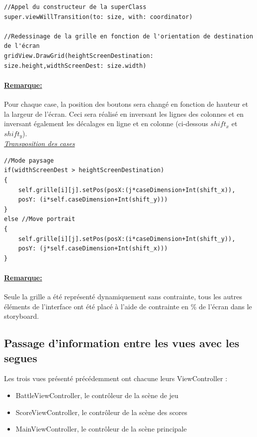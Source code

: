 \documentclass{article}
\begin{document}
\begin{verbatim}
//Appel du constructeur de la superClass
super.viewWillTransition(to: size, with: coordinator)

//Redessinage de la grille en fonction de l'orientation de destination de l'écran
gridView.DrawGrid(heightScreenDestination: size.height,widthScreenDest: size.width)
\end{verbatim}


\paragraph{\underline{Remarque:}} Pour chaque case, la position des boutons sera changé en fonction de hauteur et la largeur de l'écran. Ceci sera réalisé en inversant les lignes des colonnes et en inversant également les décalages en ligne et en colonne (ci-dessous $shift_{x}$ et $shift_{y}$). \\

\noindent \underline{\textit{Transposition des cases}}
\begin{verbatim}
//Mode paysage
if(widthScreenDest > heightScreenDestination)
{
    self.grille[i][j].setPos(posX:(j*caseDimension+Int(shift_x)), 
    posY: (i*self.caseDimension+Int(shift_y)))
}
else //Move portrait
{
    self.grille[i][j].setPos(posX:(i*caseDimension+Int(shift_y)), 
    posY: (j*self.caseDimension+Int(shift_x)))
}
\end{verbatim}

\paragraph{\underline{Remarque:}} Seule la grille a été représenté dynamiquement sans contrainte, tous les autres éléments de l'interface ont été placé à l'aide de contrainte en \%  de l'écran dans le storyboard. \\



\subsection{Passage d'information entre les vues avec les segues}

Les trois vues présenté précédemment ont chacune leurs ViewController : 
\begin{itemize}
    \item  BattleViewController, le contrôleur de la scène de jeu
    \item  ScoreViewController, le contrôleur de la scène des scores
    \item  MainViewController, le contrôleur de la scène principale\\
\end{itemize}
\end{document}
